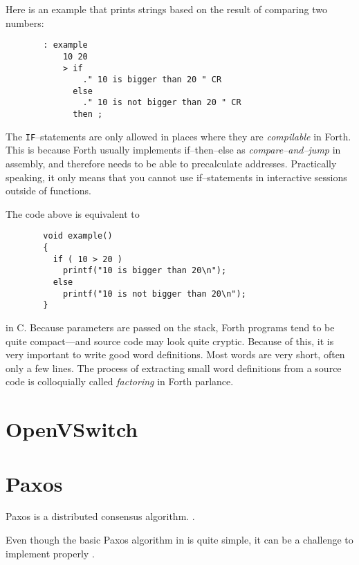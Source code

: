 Here is an example that prints strings based on the result of comparing two
numbers:

\begin{figure}[H]
  \centering
  \begin{Verbatim}
  : example
      10 20
      > if
          ." 10 is bigger than 20 " CR
        else
          ." 10 is not bigger than 20 " CR
        then ;
  \end{Verbatim}
\end{figure}

The \texttt{IF}--statements are only allowed in places where they are
\textit{compilable} in Forth. This is because Forth usually implements
if--then--else as \textit{compare--and--jump} in assembly, and therefore
needs to be able to precalculate addresses.  Practically speaking, it only
means that you cannot use if--statements in interactive sessions outside of
functions.

The code above is equivalent to

\begin{figure}[H]
  \centering
  \begin{Verbatim}
  void example()
  {
    if ( 10 > 20 )
      printf("10 is bigger than 20\n");
    else
      printf("10 is not bigger than 20\n");
  }
  \end{Verbatim}
\end{figure}

in C.  Because parameters are passed on the stack, Forth programs tend to be
quite compact---and source code may look quite cryptic.  Because of this, it
is very important to write good word definitions.  Most words are very
short, often only a few lines.  The process of extracting small word
definitions from a source code is colloquially called \textit{factoring} in
Forth parlance.

\section{OpenVSwitch}

\section{Paxos}
Paxos is a distributed consensus algorithm.
.

Even though the basic Paxos algorithm in \cite{Lam01} is quite simple, it can be
a challenge to implement properly \cite{Chandra:2007:PML:1281100.1281103}.
